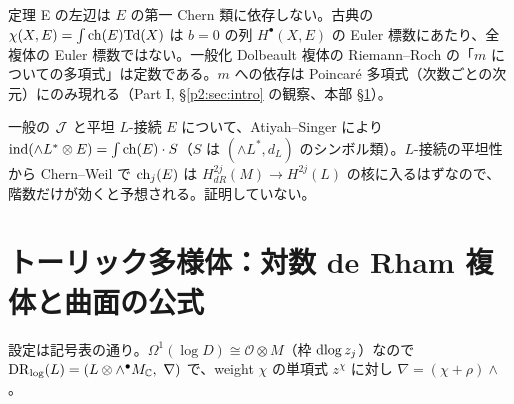 \begin{rem}[意味\ \tP]
定理 E の左辺は $E$ の第一 Chern 類に依存しない。古典の $\chi(X,E)=\int\mathrm{ch}(E)\mathrm{Td}(X)$ は $b=0$ の列 $H^\bullet(X,E)$ の Euler 標数にあたり、全複体の Euler 標数ではない。一般化 Dolbeault 複体の Riemann--Roch の「$m$ についての多項式」は定数である。$m$ への依存は Poincaré 多項式（次数ごとの次元）にのみ現れる（Part I, \S\ref{p2:sec:intro} の観察、本部 \S\ref{p2:sec:toric}）。
\end{rem}
\begin{rem}[一般の一般化複素構造\ \tK]
一般の $\mathcal J$ と平坦 $L$-接続 $E$ について、Atiyah--Singer により $\mathrm{ind}(\wedge L^*\otimes E)=\int\mathrm{ch}(E)\cdot S$（$S$ は $(\wedge L^*,d_L)$ のシンボル類）。$L$-接続の平坦性から Chern--Weil で $\mathrm{ch}_j(E)$ は $H^{2j}_{dR}(M)\to H^{2j}(L)$ の核に入るはずなので、階数だけが効くと予想される。証明していない。
\end{rem}

\section{トーリック多様体：対数 de Rham 複体と曲面の公式}\label{p2:sec:toric}
設定は記号表の通り。$\Omega^1(\log D)\cong\mathcal O\otimes M$（枠 $\mathrm{dlog}\, z_j$）なので $\mathrm{DR}_{\log}(L)=(L\otimes\wedge^\bullet M_\mathbb C,\ \nabla)$ で、weight $\chi$ の単項式 $z^\chi$ に対し $\nabla=(\chi+\rho)\wedge$。

